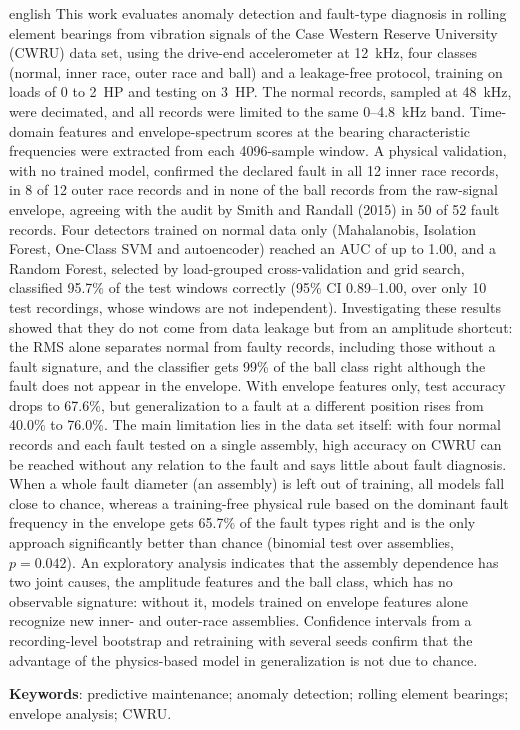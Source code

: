 \documentclass[
  12pt,
  oneside,          %
  a4paper,
  chapter=TITLE,   %
  english,
  brazil
]{abntex2}
\begin{document}
\begin{resumo}[Abstract]
  \begin{otherlanguage*}{english}
    This work evaluates anomaly detection and fault-type diagnosis in rolling
    element bearings from vibration signals of the Case Western Reserve
    University (CWRU) data set, using the drive-end accelerometer at 12~kHz,
    four classes (normal, inner race, outer race and ball) and a leakage-free
    protocol, training on loads of 0 to 2~HP and testing on 3~HP. The normal
    records, sampled at 48~kHz, were decimated, and all records were limited to
    the same 0--4.8~kHz band. Time-domain features and envelope-spectrum scores
    at the bearing characteristic frequencies were extracted from each
    4096-sample window. A physical validation, with no trained model, confirmed
    the declared fault in all 12 inner race records, in 8 of 12 outer race
    records and in none of the ball records from the raw-signal envelope, agreeing with the audit by Smith
    and Randall (2015) in 50 of 52 fault records. Four detectors trained on
    normal data only (Mahalanobis, Isolation Forest, One-Class SVM and
    autoencoder) reached an AUC of up to 1.00, and a Random Forest, selected by
    load-grouped cross-validation and grid search, classified 95.7\% of the
    test windows correctly (95\% CI 0.89--1.00, over only 10 test recordings,
    whose windows are not independent). Investigating these results showed
    that they do not come from data leakage but from an amplitude shortcut: the
    RMS alone separates normal from faulty records, including those without a
    fault signature, and the classifier gets 99\% of the ball class right
    although the fault does not appear in the envelope. With envelope features
    only, test accuracy drops to 67.6\%, but generalization to a fault at a
    different position rises from 40.0\% to 76.0\%. The main limitation lies
    in the data set itself: with four normal records and each fault tested on a
    single assembly, high accuracy on CWRU can be reached without any relation
    to the fault and says little about fault diagnosis. When a whole fault diameter (an assembly) is left out of
    training, all models fall close to chance, whereas a training-free physical
    rule based on the dominant fault frequency in the envelope gets 65.7\% of
    the fault types right and is the only approach significantly better than
    chance (binomial test over assemblies, $p = 0.042$). An exploratory
    analysis indicates that the assembly dependence has two joint causes, the
    amplitude features and the ball class, which has no observable signature:
    without it, models trained on envelope features alone recognize new
    inner- and outer-race assemblies. Confidence intervals
    from a recording-level bootstrap and retraining with several seeds confirm
    that the advantage of the physics-based model in generalization is not due
    to chance.

    \textbf{Keywords}: predictive maintenance; anomaly detection; rolling
    element bearings; envelope analysis; CWRU.
  \end{otherlanguage*}
\end{resumo}
\end{document}
